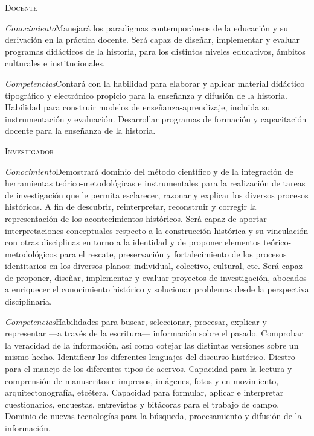 \begin{scriptsize}
\begin{framed}
\textsc{Docente}

\textit{Conocimiento}\quad Manejará los paradigmas contemporáneos de la 
educación y su derivación en la práctica docente. Será capaz de 
diseñar, implementar y evaluar programas didácticos de la historia, 
para los distintos niveles educativos, ámbitos culturales e 
institucionales. 

\textit{Competencias}\quad Contará con la 
habilidad para elaborar y aplicar material didáctico tipográfico y 
electrónico propicio para la enseñanza y difusión de la historia. 
Habilidad para construir modelos de enseñanza-aprendizaje, incluida su 
instrumentación y evaluación. Desarrollar programas de formación y 
capacitación docente para la enseñanza de la historia.  

\textsc{Investigador} 

\textit{Conocimiento}\quad Demostrará 
dominio del método científico y de la integración  de herramientas 
teórico-metodológicas e instrumentales para la realización de tareas de 
investigación que le permita esclarecer, razonar y explicar los 
diversos procesos históricos. A fin de  descubrir,  reinterpretar, 
reconstruir y corregir la representación de los acontecimientos 
históricos. Será capaz de aportar interpretaciones conceptuales 
respecto a la construcción histórica y su vinculación con otras 
disciplinas en torno a la identidad y de proponer elementos 
teórico-metodológicos para el rescate, preservación y fortalecimiento 
de los procesos identitarios en los diversos planos: individual, 
colectivo, cultural, etc. Será capaz de proponer, diseñar, implementar 
y evaluar proyectos de investigación, abocados a enriquecer el 
conocimiento histórico y  solucionar problemas desde la perspectiva 
disciplinaria.  

\textit{Competencias}\quad Habilidades 
para buscar, seleccionar, procesar, explicar y representar ---a través de 
la escritura--- información sobre el pasado.  Comprobar la veracidad de 
la información, así como cotejar las distintas versiones sobre un mismo 
hecho. Identificar los diferentes lenguajes del discurso histórico. 
Diestro para el manejo de los diferentes tipos de acervos. Capacidad 
para la lectura y comprensión de manuscritos e impresos, imágenes, 
fotos y en movimiento, arquitectonografía, etcétera.  Capacidad para 
formular, aplicar e interpretar cuestionarios, encuestas, entrevistas y 
bitácoras para el trabajo de campo. Dominio de nuevas tecnologías para 
la búsqueda, procesamiento y difusión de la información.  


\end{framed}
\end{scriptsize}
